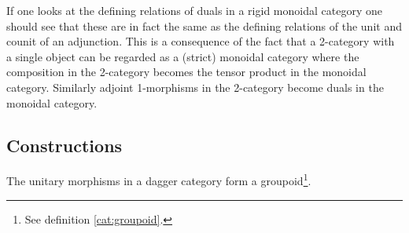 	\begin{remark}
		If one looks at the defining relations of duals in a rigid monoidal category one should see that these are in fact the same as the defining relations of the unit and counit of an adjunction. This is a consequence of the fact that a 2-category with a single object can be regarded as a (strict) monoidal category where the composition in the 2-category becomes the tensor product in the monoidal category. Similarly adjoint 1-morphisms in the 2-category become duals in the monoidal category.
	\end{remark}

\subsection{Constructions}


	\begin{property}
		The unitary morphisms in a dagger category form a groupoid\footnote{See definition \ref{cat:groupoid}.}.
	\end{property}
	
